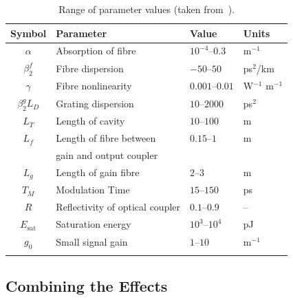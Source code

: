 \documentclass[9pt,twocolumn,twoside]{osajnl}
\newcommand{\Es}{E_{\textrm{sat}}} %
\begin{document}
\begin{table}[tbp]
	\centering
	\caption{Range of parameter values (taken from~\cite{agrawal2013, burgoyne2014, burgoyneemail, tamura1996, usechak2005}).}
 	\label{tab:values}
 	\begin{tabular}{clll}
		\hline\noalign{\smallskip}
		Symbol & Parameter & Value & Units \\
		\hline\noalign{\smallskip}
		$\alpha$ & Absorption of fibre & $10^{-4}$--$0.3$ & m$^{-1}$ \\
		$\beta_2^f$ & Fibre dispersion & $-50$--$50$ & ps$^2$/km \\
		$\gamma$ & Fibre nonlinearity & $0.001$--$0.01$ & W$^{-1}$ m$^{-1}$ \\
		$\beta_2^g L_D$ & Grating dispersion & $10$--$2000$ & ps$^2$ \\
		$L_T$ & Length of cavity & $10$--$100$ & m \\
		\vspace*{-2mm} $L_f$ & Length of fibre between & $0.15$--$1$ & m \\
		& gain and output coupler & & \\
		$L_g$ & Length of gain fibre & $2$--$3$ & m \\
		$T_M$ & Modulation Time & $15$--$150$ & ps \\
		$R$ & Reflectivity of optical coupler & $0.1$--$0.9$ & -- \\
		$\Es$ & Saturation energy & $10^3$--$10^4$ & pJ \\
		$g_0$ & Small signal gain &  $1$--$10$ & m$^{-1}$ \\
		\noalign{\smallskip}\hline
	\end{tabular}
\end{table}

\subsection{Combining the Effects}
\label{sec:effects}
\end{document}
